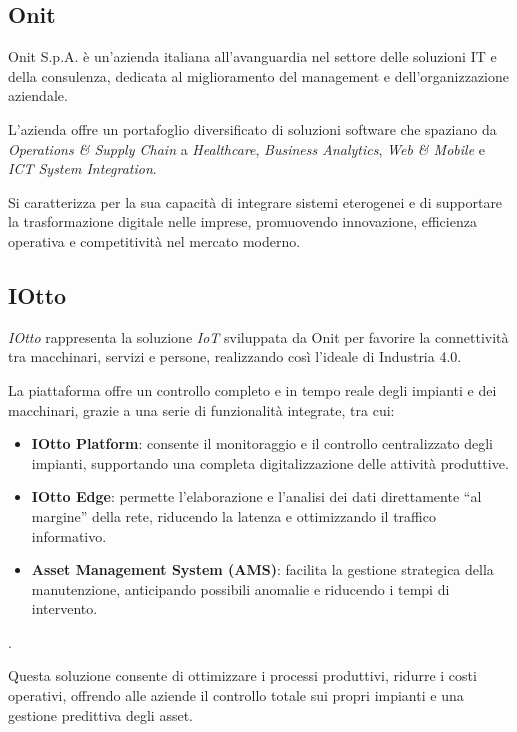 \documentclass[12pt,a4paper,openright,twoside]{book}
\begin{document}
        \subsection{Onit}

            Onit S.p.A. è un’azienda italiana all’avanguardia nel settore delle soluzioni IT e della consulenza, dedicata al miglioramento del management e dell’organizzazione aziendale.

            L'azienda offre un portafoglio diversificato di soluzioni software che spaziano da \textit{Operations \& Supply Chain} a \textit{Healthcare}, \textit{Business Analytics}, \textit{Web \& Mobile} e \textit{ICT System Integration}.

            Si caratterizza per la sua capacità di integrare sistemi eterogenei e di supportare la trasformazione digitale nelle imprese, promuovendo innovazione, efficienza operativa e competitività nel mercato moderno.

        \subsection{IOtto}

            \textit{IOtto} rappresenta la soluzione \textit{IoT} sviluppata da Onit per favorire la connettività tra macchinari, servizi e persone, realizzando così l’ideale di Industria 4.0.

            \pagebreak

            La piattaforma offre un controllo completo e in tempo reale degli impianti e dei macchinari, grazie a una serie di funzionalità integrate, tra cui:
            \begin{itemize}
                \item \textbf{IOtto Platform}: consente il monitoraggio e il controllo centralizzato degli impianti, supportando una completa digitalizzazione delle attività produttive.
                \item \textbf{IOtto Edge}: permette l’elaborazione e l’analisi dei dati direttamente “al margine” della rete, riducendo la latenza e ottimizzando il traffico informativo.
                \item \textbf{Asset Management System (AMS)}: facilita la gestione strategica della manutenzione, anticipando possibili anomalie e riducendo i tempi di intervento.
            \end{itemize}.

            Questa soluzione consente di ottimizzare i processi produttivi, ridurre i costi operativi, offrendo alle aziende il controllo totale sui propri impianti e una gestione predittiva degli asset.
\end{document}
